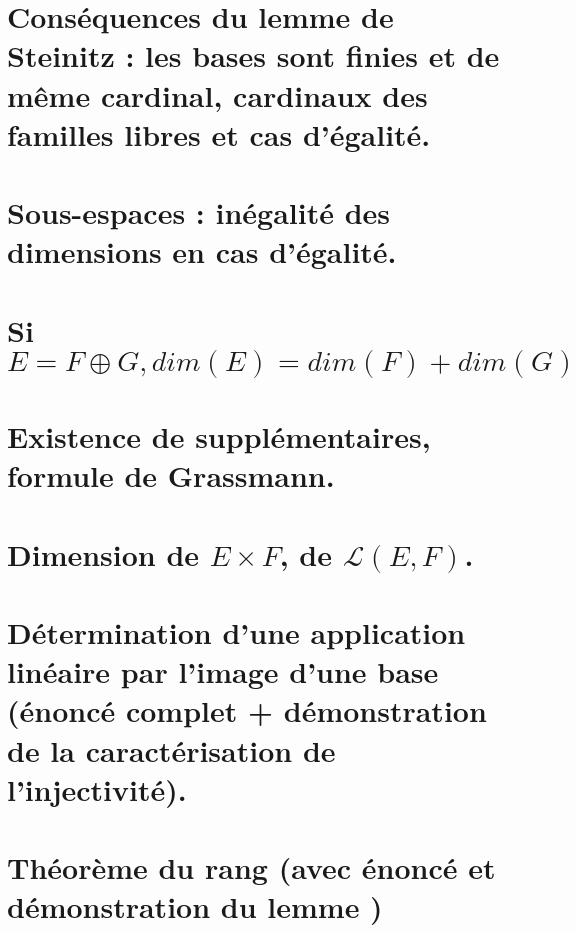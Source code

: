 \documentclass{article}
\begin{document}
\section{Conséquences du lemme de Steinitz : les bases sont finies et de même cardinal, cardinaux des familles libres et cas d'égalité.}
\section{Sous-espaces : inégalité des dimensions en cas d'égalité. }
\section{Si $E= F \oplus G, dim(E)=dim(F)+dim(G)$}
\section{Existence de supplémentaires, formule de Grassmann.}
\section{Dimension de $E \times F$, de $\mathcal L(E,F)$.}
\section{Détermination d'une application linéaire par l'image d'une base (énoncé complet + démonstration de la caractérisation de l'injectivité).}
\section{Théorème du rang (avec énoncé et démonstration du lemme )}
\end{document}
